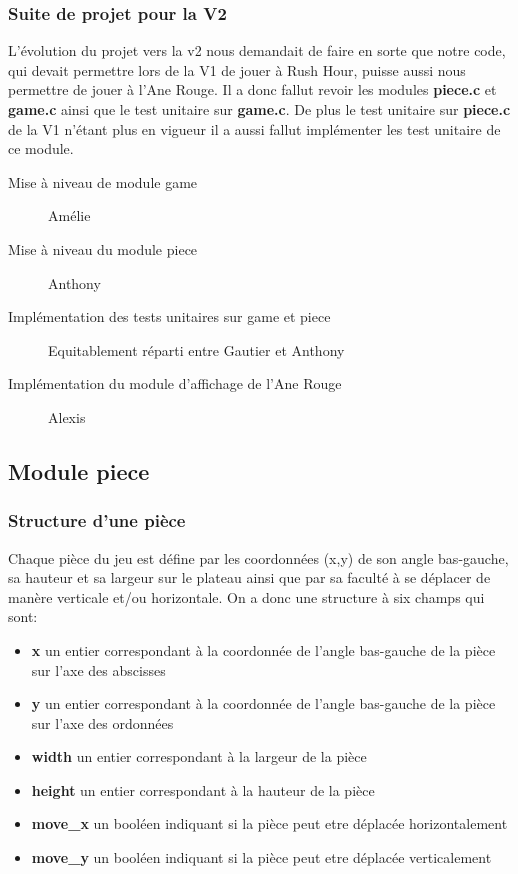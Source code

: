 \documentclass{report}
\begin{document}
\subsubsection*{Suite de projet pour la V2}
L'évolution du projet vers la v2 nous demandait de faire en sorte que notre code, qui devait permettre lors de la V1 de jouer à Rush Hour, puisse aussi nous permettre de jouer à l'Ane Rouge. Il a donc fallut revoir les modules \textbf{piece.c} et \textbf{game.c} ainsi que le test unitaire sur \textbf{game.c}. De plus le test unitaire sur \textbf{piece.c} de la V1 n'étant plus en vigueur il a aussi fallut implémenter les test unitaire de ce module.
\begin{description}
\item [Mise à niveau de module game] Amélie
\item [Mise à niveau du module piece] Anthony
\item [Implémentation des tests unitaires sur game et piece] Equitablement réparti entre Gautier et Anthony
\item [Implémentation du module d'affichage de l'Ane Rouge] Alexis
\end{description}

\subsection{Module piece}
\subsubsection*{Structure d'une pièce}
Chaque pièce du jeu est défine par les coordonnées (x,y) de son angle bas-gauche, sa hauteur et sa largeur sur le plateau ainsi que par sa faculté à se déplacer de manère verticale et/ou horizontale.
On a donc une structure à six champs qui sont:
\begin{itemize}
\item \textbf{x} un entier correspondant à la coordonnée de l'angle bas-gauche de la pièce sur l'axe des abscisses
\item \textbf{y} un entier correspondant à la coordonnée de l'angle bas-gauche de la pièce sur l'axe des ordonnées
\item \textbf{width} un entier correspondant à la largeur de la pièce
\item \textbf{height} un entier correspondant à la hauteur de la pièce
\item \textbf{move\_x} un booléen indiquant si la pièce peut etre déplacée horizontalement
\item \textbf{move\_y} un booléen indiquant si la pièce peut etre déplacée verticalement
\end{itemize} 
\end{document}
